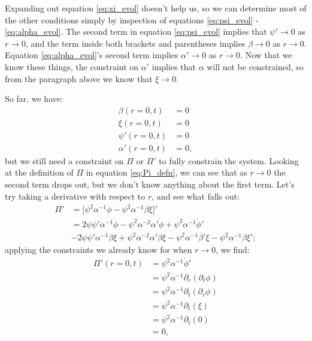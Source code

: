 \documentclass[12pt]{article}
\numberwithin{equation}{section}
\begin{document}
Expanding out equation \ref{eq:xi_evol} doesn't help us, so we can determine most of the other conditions simply by inspection of equations \ref{eq:psi_evol} - \ref{eq:alpha_evol}.  The second term in equation \ref{eq:psi_evol} implies that $\psi' \to 0$ as $r \to 0$, and the term inside both brackets and parentheses implies $\beta \to 0$ as $r \to 0$.  Equation \ref{eq:alpha_evol}'s second term implies $\alpha' \to 0$ as $r \to 0$.  Now that we know these things, the constraint on $\alpha'$ implies that $\alpha$ will not be constrained, so from the paragraph above we know that $\xi \to 0$.  

So far, we have:
\begin{equation*}
\begin{aligned}
\beta  (r=0, t) &= 0 \\
\xi    (r=0, t) &= 0 \\
\psi'  (r=0, t) &= 0 \\
\alpha'(r=0, t) &= 0,
\end{aligned}
\end{equation*}
but we still need a constraint on $\Pi$ or $\Pi'$ to fully constrain the system.  Looking at the definition of $\Pi$ in equation \ref{eq:Pi_defn}, we can see that as $r \to 0$ the second term drops out, but we don't know anything about the first term.  Let's try taking a derivative with respect to $r$, and see what falls out:
\begin{equation*}
\begin{aligned}
\Pi' &= \Big[ \psi^2 \alpha^{-1} \dot{\phi} - \psi^2 \alpha^{-1} \beta \xi \Big]' \\
&= 2 \psi \psi' \alpha^{-1} \dot{\phi} - \psi^2 \alpha^{-2} \alpha' \dot{\phi} + \psi^2 \alpha^{-1} \dot{\phi}' \\
&- 2 \psi \psi' \alpha^{-1} \beta \xi + \psi^2 \alpha^{-2} \alpha' \beta \xi - \psi^2 \alpha^{-1} \beta' \xi - \psi^2 \alpha^{-1} \beta \xi';
\end{aligned}
\end{equation*}
applying the constraints we already know for when $r \to 0$, we find:
\begin{equation*}
\begin{aligned}
\Pi'(r=0, t) &= \psi^2 \alpha^{-1} \dot{\phi}' \\
&= \psi^2 \alpha^{-1} \partial_r (\partial_t \phi) \\
&= \psi^2 \alpha^{-1} \partial_t (\partial_r \phi) \\
&= \psi^2 \alpha^{-1} \partial_t (\xi) \\
&= \psi^2 \alpha^{-1} \partial_t (0) \\
&= 0,
\end{aligned}
\end{equation*}
\end{document}
